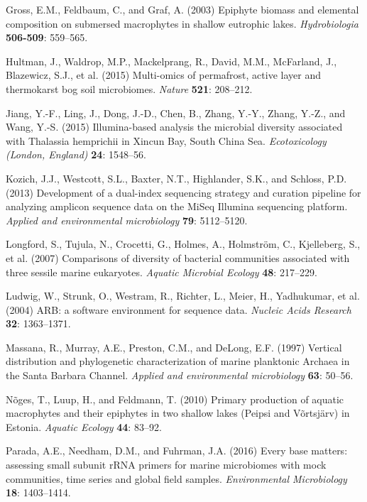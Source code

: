 \documentclass[12pt,]{article}
\begin{document}
\hypertarget{ref-Gross2003}{}
Gross, E.M., Feldbaum, C., and Graf, A. (2003) Epiphyte biomass and
elemental composition on submersed macrophytes in shallow eutrophic
lakes. \emph{Hydrobiologia} \textbf{506-509}: 559--565.

\hypertarget{ref-Hultman2015}{}
Hultman, J., Waldrop, M.P., Mackelprang, R., David, M.M., McFarland, J.,
Blazewicz, S.J., et al. (2015) Multi-omics of permafrost, active layer
and thermokarst bog soil microbiomes. \emph{Nature} \textbf{521}:
208--212.

\hypertarget{ref-Jiang2015}{}
Jiang, Y.-F., Ling, J., Dong, J.-D., Chen, B., Zhang, Y.-Y., Zhang,
Y.-Z., and Wang, Y.-S. (2015) Illumina-based analysis the microbial
diversity associated with Thalassia hemprichii in Xincun Bay, South
China Sea. \emph{Ecotoxicology (London, England)} \textbf{24}: 1548--56.

\hypertarget{ref-Kozich2013}{}
Kozich, J.J., Westcott, S.L., Baxter, N.T., Highlander, S.K., and
Schloss, P.D. (2013) Development of a dual-index sequencing strategy and
curation pipeline for analyzing amplicon sequence data on the MiSeq
Illumina sequencing platform. \emph{Applied and environmental
microbiology} \textbf{79}: 5112--5120.

\hypertarget{ref-Longford2007}{}
Longford, S., Tujula, N., Crocetti, G., Holmes, A., Holmström, C.,
Kjelleberg, S., et al. (2007) Comparisons of diversity of bacterial
communities associated with three sessile marine eukaryotes.
\emph{Aquatic Microbial Ecology} \textbf{48}: 217--229.

\hypertarget{ref-Ludwig2004}{}
Ludwig, W., Strunk, O., Westram, R., Richter, L., Meier, H., Yadhukumar,
et al. (2004) ARB: a software environment for sequence data.
\emph{Nucleic Acids Research} \textbf{32}: 1363--1371.

\hypertarget{ref-Massana1997}{}
Massana, R., Murray, A.E., Preston, C.M., and DeLong, E.F. (1997)
Vertical distribution and phylogenetic characterization of marine
planktonic Archaea in the Santa Barbara Channel. \emph{Applied and
environmental microbiology} \textbf{63}: 50--56.

\hypertarget{ref-Noges2010}{}
Nõges, T., Luup, H., and Feldmann, T. (2010) Primary production of
aquatic macrophytes and their epiphytes in two shallow lakes (Peipsi and
Võrtsjärv) in Estonia. \emph{Aquatic Ecology} \textbf{44}: 83--92.

\hypertarget{ref-Parada2016}{}
Parada, A.E., Needham, D.M., and Fuhrman, J.A. (2016) Every base
matters: assessing small subunit rRNA primers for marine microbiomes
with mock communities, time series and global field samples.
\emph{Environmental Microbiology} \textbf{18}: 1403--1414.
\end{document}
